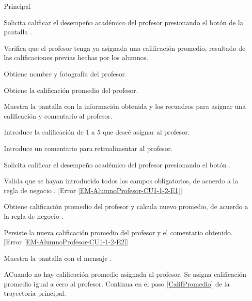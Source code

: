 \begin{UCtrayectoria}{Principal}

	\UCpaso [\UCactor] Solicita calificar el desempeño académico del profesor presionando el botón  de la pantalla .

	\UCpaso Verifica que el profesor tenga ya asignada una calificación promedio, resultado de las calificaciones previas hechas por los alumnos. 

	\UCpaso Obtiene nombre y fotografía del profesor.  \label{CalifPromedio}

	\UCpaso Obtiene la calificación promedio del profesor. 

	\UCpaso Muestra la pantalla  con la información obtenida y los recuadros para asignar una calificación y comentario al profesor. 

	\UCpaso [\UCactor] Introduce la calificación de 1 a 5 que deseé asignar al profesor. \label{InfoObligatoria} 

	\UCpaso [\UCactor] Introduce un comentario para retroalimentar al profesor.

	\UCpaso [\UCactor] Solicita calificar el desempeño académico del profesor presionando el botón .

	\UCpaso Valida que se hayan introducido todos los campos obligatorios, de acuerdo a la regla de negocio . [Error \ref{EM-AlumnoProfesor-CU1-1-2-E1}]
	
	\UCpaso Obtiene calificación promedio del profesor y calcula nuevo promedio, de acuerdo a la regla de negocio . 
	
	\UCpaso Persiste la nueva calificación promedio del profesor y el comentario obtenido. [Error \ref{EM-AlumnoProfesor-CU1-1-2-E2}]

	\UCpaso Muestra la pantalla  con el mensaje .
\end{UCtrayectoria}

\begin{UCtrayectoriaA}{A}{Cuando no hay calificación promedio asignada al profesor.}
	\UCpaso	Se asigna calificación promedio igual a cero al profesor.
	\UCpaso Continua en el paso \ref{CalifPromedio} de la trayectoria principal.
\end{UCtrayectoriaA}


